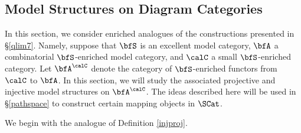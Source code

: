 



\subsection{Model Structures on Diagram Categories}\label{quasilimit3}

In this section, we consider enriched analogues of the constructions presented in
\S \ref{qlim7}. Namely, suppose that $\bfS$ is an excellent model category,
$\bfA$ a combinatorial $\bfS$-enriched model category, and $\calC$ a small
$\bfS$-enriched category. Let $\bfA^{\calC}$ denote the category of
$\bfS$-enriched functors from $\calC$ to $\bfA$. In this section, we will study the associated
projective and injective model structures on $\bfA^{\calC}$. The ideas described here will be used in \S \ref{pathspace} to construct certain mapping objects in $\SCat$.

We begin with the analogue of Definition \ref{injproj}.

